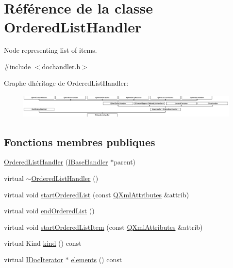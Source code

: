 \hypertarget{class_ordered_list_handler}{}\section{Référence de la classe Ordered\+List\+Handler}
\label{class_ordered_list_handler}


Node representing list of items.  




{\ttfamily \#include $<$dochandler.\+h$>$}

Graphe d\textquotesingle{}héritage de Ordered\+List\+Handler\+:\begin{figure}[H]
\begin{center}
\leavevmode
\includegraphics[height=1.311475cm]{class_ordered_list_handler}
\end{center}
\end{figure}
\subsection*{Fonctions membres publiques}
\begin{DoxyCompactItemize}
\item 
\hyperlink{class_ordered_list_handler_aa76fb23b22ea41a460a6e68a3fe62fd5}{Ordered\+List\+Handler} (\hyperlink{class_i_base_handler}{I\+Base\+Handler} $\ast$parent)
\item 
virtual \hyperlink{class_ordered_list_handler_ac210932e87c151aedc0a9d80c3ca6366}{$\sim$\+Ordered\+List\+Handler} ()
\item 
virtual void \hyperlink{class_ordered_list_handler_a735a356c52a8c0338cc709bce5368ba1}{start\+Ordered\+List} (const \hyperlink{class_q_xml_attributes}{Q\+Xml\+Attributes} \&attrib)
\item 
virtual void \hyperlink{class_ordered_list_handler_a1cf37222d852f312a05425a241dbbd7f}{end\+Ordered\+List} ()
\item 
virtual void \hyperlink{class_ordered_list_handler_afebcceb1d60b0dab32c53775f9cbfb75}{start\+Ordered\+List\+Item} (const \hyperlink{class_q_xml_attributes}{Q\+Xml\+Attributes} \&attrib)
\item 
virtual Kind \hyperlink{class_ordered_list_handler_a93d813727e989e9a889e2f7629d84631}{kind} () const 
\item 
virtual \hyperlink{class_i_doc_iterator}{I\+Doc\+Iterator} $\ast$ \hyperlink{class_ordered_list_handler_ac9c159f9f866de037b54b6e993ea5a47}{elements} () const 
\end{DoxyCompactItemize}
